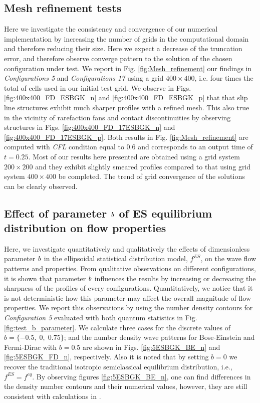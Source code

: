 \documentclass{rsproca}%
\begin{document}
\subsection{Mesh refinement tests}
Here we investigate the consistency and convergence of our numerical implementation by increasing the number of grids in the computational domain and therefore reducing their size. Here we expect a decrease of the truncation error, and therefore observe converge pattern to the solution of the chosen configuration under test. We report in Fig. \ref{fig:Mesh_refinement} our findings in \emph{Configurations 5} and \emph{Configurations 17} using a grid $400\times400$, i.e. four times the total of cells used in our initial test grid. We observe in Figs. \ref{fig:400x400_FD_ESBGK_n} and \ref{fig:400x400_FD_ESBGK_p} that that slip line structures exhibit much sharper profiles with a refined mesh. This also true in the vicinity of rarefaction fans and contact discontinuities by observing structures in Figs. \ref{fig:400x400_FD_17ESBGK_n} and \ref{fig:400x400_FD_17ESBGK_p}. Both results in Fig. \ref{fig:Mesh_refinement} are computed with \emph{CFL} condition equal to 0.6 and corresponds to an output time of $t=0.25$. Most of our results here presented are obtained using a grid system $200\times200$ and they exhibit slightly smeared profiles compared to that using grid system $400\times400$ be completed.  The trend of grid convergence of the solutions can be clearly observed.



\subsection{Effect of parameter \texorpdfstring{$\it{b}$}{Lg} of ES equilibrium distribution on flow properties }

Here, we investigate quantitatively and qualitatively the effects of dimensionless parameter $\it{b}$ in the ellipsoidal statistical distribution model, $f^{ES}$, on the wave flow patterns and properties.  From qualitative observations on different configurations, it is shown that parameter $\it{b}$ influences the results by increasing or decreasing the sharpness of the profiles of every configurations. Quantitatively, we notice that it is not deterministic how this parameter may affect the overall magnitude of flow properties. We report this observations by using the number density contours for \emph{Configuration 5} evaluated with both quantum statistics in Fig. \ref{fig:test_b_parameter}.  We calculate three cases for the discrete values of $b=\{-0.5,\;0,\;0.75\}$; and the number density wave patterns for Bose-Einstein and Fermi-Dirac with $b=0.5$ are shown in Figs. \ref{fig:5ESBGK_BE_n} and \ref{fig:5ESBGK_FD_n}, respectively. Also it is noted that by setting $b=0$ we recover the traditional isotropic semiclassical equilibrium distribution, i.e., $f^{ES}= f^{eq}$.  By observing figures \ref{fig:5ESBGK_BE_n}, one can find differences in the density number contours and their numerical values, however, they are still consistent with calculations in \cite{Laxliu95}\cite{schultzrinne}.
\end{document}
